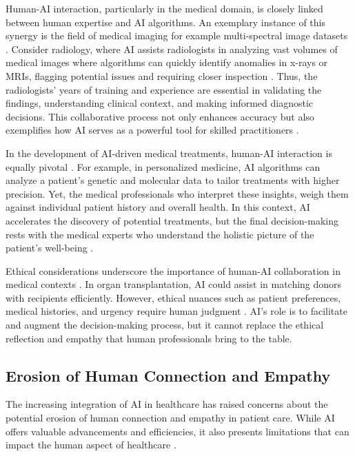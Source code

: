 \documentclass{article}
\begin{document}
Human-AI interaction, particularly in the medical domain, is closely linked between human expertise and AI algorithms. An exemplary instance of this synergy is the field of medical imaging for example multi-spectral image datasets \cite{munir2019extensive}. Consider radiology, where AI assists radiologists in analyzing vast volumes of medical images where algorithms can quickly identify anomalies in x-rays or MRIs, flagging potential issues and requiring closer inspection \cite{hosny2018artificial}. Thus, the radiologists' years of training and experience are essential in validating the findings, understanding clinical context, and making informed diagnostic decisions. This collaborative process not only enhances accuracy but also exemplifies how AI serves as a powerful tool for skilled practitioners \cite{agarwal2023combining, king2018artificial}.

In the development of AI-driven medical treatments, human-AI interaction is equally pivotal \cite{ahuja2019impact, esmaeilzadeh2021patients}. For example, in personalized medicine, AI algorithms can analyze a patient's genetic and molecular data to tailor treatments with higher precision. Yet, the medical professionals who interpret these insights, weigh them against individual patient history and overall health. In this context, AI accelerates the discovery of potential treatments, but the final decision-making rests with the medical experts who understand the holistic picture of the patient's well-being \cite{ schork2019artificial, johnson2021precision}.

Ethical considerations underscore the importance of human-AI collaboration in medical contexts \cite{kamila2023ethical}. In organ transplantation, AI could assist in matching donors with recipients efficiently. However, ethical nuances such as patient preferences, medical histories, and urgency require human judgment \cite{clement2021augmenting, peloso2022artificial}. AI's role is to facilitate and augment the decision-making process, but it cannot replace the ethical reflection and empathy that human professionals bring to the table.


\subsection{Erosion of Human Connection and Empathy}
The increasing integration of AI in healthcare has raised concerns about the potential erosion of human connection and empathy in patient care. While AI offers valuable advancements and efficiencies, it also presents limitations that can impact the human aspect of healthcare \cite{kamensky2019artificial}.
\end{document}

